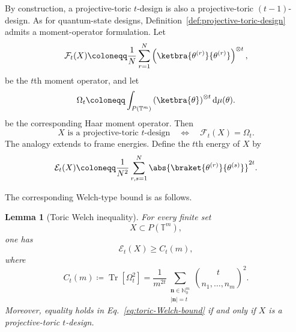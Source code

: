 \documentclass[aps,twocolumn,pra,superscriptaddress,nofootinbib]{revtex4-2}
\newtheorem{lemma}{Lemma}
\newcommand{\mF}{\mathcal{F}}
\begin{document}
By construction, a projective-toric $t$-design is also a
projective-toric $(t-1)$-design. As for quantum-state designs,
Definition~\ref{def:projective-toric-design} admits a moment-operator
formulation. Let
\begin{equation}
    \mF_{t}(X)
    \coloneqq
    \frac{1}{N}
    \sum_{r=1}^{N}
    \left(
        \ketbra{\theta^{(r)}}{\theta^{(r)}}
    \right)^{\otimes t},
    \label{eq:toric-frame-operator}
\end{equation}
be the $t$th moment operator, and let
\begin{equation}
    \Omega_{t}
    \coloneqq
    \int_{P(\mathbb{T}^{m})}
    \left(
        \ketbra{\theta}
    \right)^{\otimes t}
    \mathrm{d}\mu(\theta).
    \label{eq:toric-Haar-moment}
\end{equation}
be the corresponding Haar moment operator. Then
\begin{equation}
    X \text{ is a projective-toric $t$-design}
    \quad\Longleftrightarrow\quad
    \mF_{t}(X)=\Omega_{t}.
    \label{eq:toric-moment-characterization}
\end{equation}
The analogy extends to frame energies. Define the $t$th energy of $X$
by
\begin{equation}
    \mathcal{E}_{t}(X)
    \coloneqq
    \frac{1}{N^{2}}
    \sum_{r,s=1}^{N}
    \abs{ \braket{ \theta^{(r)}}{\theta^{(s)}}}^{2t}.
    \label{eq:toric-energy}
\end{equation}


The corresponding Welch-type bound is as follows.


\begin{lemma}[Toric Welch inequality]
\label{lem:toric-Welch}
For every finite set
\begin{equation}
    X\subset P(\mathbb{T}^{m}),
\end{equation}
one has
\begin{equation}
    \mathcal{E}_{t}(X)
    \geq
    C_{t}(m),
    \label{eq:toric-Welch-bound}
\end{equation}
where
\begin{equation}
    C_{t}(m)
    \coloneqq
    \operatorname{Tr}\!\left[\Omega_{t}^{2}\right]
    =
    \frac{1}{m^{2t}}
    \sum_{\substack{\mathbf n\in\mathbb{N}_{0}^{m}\\|\mathbf n|=t}}
    \binom{t}{n_{1},\ldots,n_{m}}^{2}.
    \label{eq:toric-Welch-constant}
\end{equation}
Moreover, equality holds in Eq.~\eqref{eq:toric-Welch-bound} if and
only if $X$ is a projective-toric $t$-design.
\end{lemma}
\end{document}
